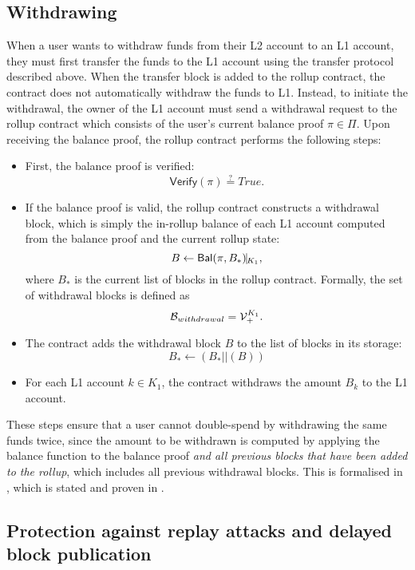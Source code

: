 \subsection{Withdrawing}\label{section:withdrawing}

When a user wants to withdraw funds from their L2 account to an L1 account, they must first transfer the funds to the L1 account using the transfer protocol described above. When the transfer block is added to the rollup contract, the contract does not automatically withdraw the funds to L1. Instead, to initiate the withdrawal, the owner of the L1 account must send a withdrawal request to the rollup contract which consists of the user's current balance proof \(\pi \in \Pi\). Upon receiving the balance proof, the rollup contract performs the following steps:

\begin{itemize}
	\item First, the balance proof is verified: \[\mathsf{Verify}(\pi) \stackrel{?}{=} True.\]
	\item If the balance proof is valid, the rollup contract constructs a withdrawal block, which is simply the in-rollup balance of each L1 account computed from the balance proof and the current rollup state:
	      \[B \leftarrow \mathsf{Bal}(\pi,B_*)\vline_{K_1},\] where \(B_*\) is the current list of blocks in the rollup contract. Formally, the set of withdrawal blocks is defined \href{https://github.com/\repo FVIntmax/Block.lean#L31}{\ExternalLink}as \[\mathcal{B}_{withdrawal} = \mathcal{V}_+^{K_1}.\]
	\item The contract adds the withdrawal block \(B\) to the list of blocks in its storage: \[B_* \leftarrow (B_* || (B))\]
	\item For each L1 account \(k \in K_1\), the contract withdraws the amount \(B_k\) to the L1 account.
\end{itemize}

These steps ensure that a user cannot double-spend by withdrawing the same funds twice, since the amount to be withdrawn is computed by applying the balance function to the balance proof \emph{and all previous blocks that have been added to the rollup}, which includes all previous withdrawal blocks. This is formalised in , which is stated and proven in .

\subsection{Protection against replay attacks and delayed block publication}\label{section:protection}


